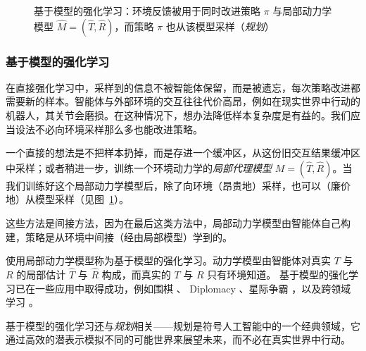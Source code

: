 
\begin{figure}[ht]
  \begin{center}
    
    \caption{基于模型的强化学习：环境反馈被用于同时改进策略 $\pi$ 与局部动力学模型 $\hat{M}=(\hat{T},\hat{R})$，而策略 $\pi$ 也从该模型采样（{\em 规划}）}\label{fig:mbrl}
  \end{center}
\end{figure}

\subsubsection{基于模型的强化学习}
在直接强化学习中，采样到的信息不被智能体保留，而是被遗忘，每次策略改进都需要新的样本。智能体与外部环境的交互往往代价高昂，例如在现实世界中行动的机器人，其关节会磨损。在这种情况下，想办法降低样本复杂度是有益的。我们应当设法不必向环境采样那么多也能改进策略。

一个直接的想法是不把样本扔掉，而是存进一个缓冲区，从这份旧交互结果缓冲区中采样；或者稍进一步，训练一个环境动力学的{\em 局部代理模型} $M=(\hat{T}, \hat{R})$。当我们训练好这个局部动力学模型后，除了向环境（昂贵地）采样，也可以（廉价地）从模型采样（见图~\ref{fig:mbrl}）。

这些方法是间接方法，因为在最后这类方法中，局部动力学模型由智能体自己构建，策略是从环境中间接（经由局部模型）学到的。

使用局部动力学模型称为基于模型的强化学习。动力学模型由智能体对真实 $T$ 与 $R$ 的局部估计 $\hat{T}$ 与 $\hat{R}$ 构成，而真实的 $T$ 与 $R$ 只有环境知道。
基于模型的强化学习已在一些应用中取得成功，例如围棋 \citep{silver2016mastering}、 Diplomacy \citep{meta2022human}、星际争霸 \citep{vinyals2019grandmaster}，以及跨领域学习 \citep{hafner2020mastering}。


基于模型的强化学习还与{\em 规划}相关——规划是符号人工智能中的一个经典领域，它通过高效的潜表示模拟不同的可能世界来展望未来，而不必在真实世界中行动。

